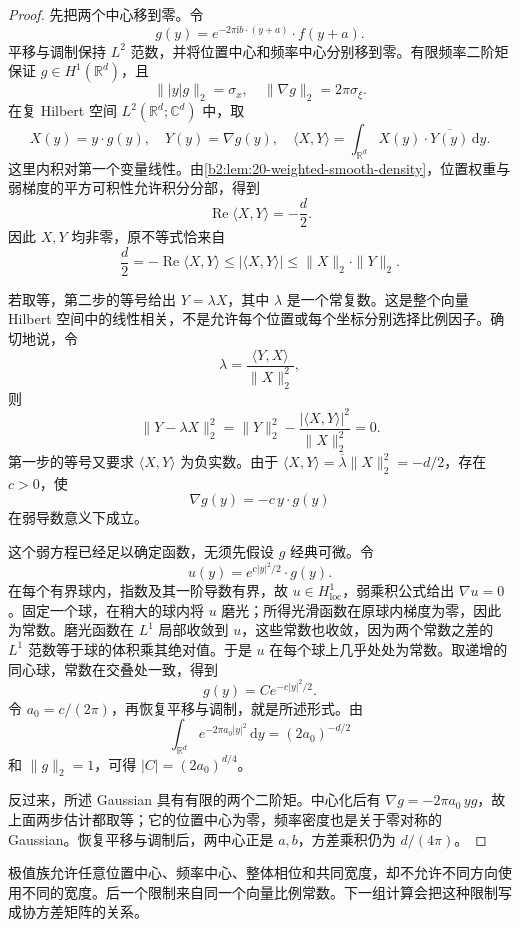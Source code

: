 \begin{proof}
先把两个中心移到零。令
\[
 g(y)=e^{-2\pi\mathrm i b\cdot(y+a)}\cdot f(y+a).
\]
平移与调制保持 \(L^2\) 范数，并将位置中心和频率中心分别移到零。有限频率二阶矩保证 \(g\in H^1(\mathbb R^d)\)，且
\[
 \||y|g\|_2=\sigma_x,
 \quad
 \|\nabla g\|_2=2\pi\sigma_\xi.
\]
在复 Hilbert 空间 \(L^2(\mathbb R^d;\mathbb C^d)\) 中，取
\[
 X(y)=y\cdot g(y),
 \quad
 Y(y)=\nabla g(y),
 \quad
 \langle X,Y\rangle
 =\int_{\mathbb R^d}X(y)\cdot\overline{Y(y)}\,\mathrm dy.
\]
这里内积对第一个变量线性。由\cref{b2:lem:20-weighted-smooth-density}，位置权重与弱梯度的平方可积性允许积分分部，得到
\[
 \operatorname{Re}\langle X,Y\rangle=-\frac d2.
\]
因此 \(X,Y\) 均非零，原不等式恰来自
\[
 \frac d2
 =-\operatorname{Re}\langle X,Y\rangle
 \leq|\langle X,Y\rangle|
 \leq\|X\|_2\cdot\|Y\|_2.
\]

若取等，第二步的等号给出 \(Y=\lambda X\)，其中 \(\lambda\) 是一个常复数。这是整个向量 Hilbert 空间中的线性相关，不是允许每个位置或每个坐标分别选择比例因子。确切地说，令
\[
 \lambda=\frac{\langle Y,X\rangle}{\|X\|_2^2},
\]
则
\[
 \|Y-\lambda X\|_2^2
 =\|Y\|_2^2-\frac{|\langle X,Y\rangle|^2}{\|X\|_2^2}=0.
\]
第一步的等号又要求 \(\langle X,Y\rangle\) 为负实数。由于
\(\langle X,Y\rangle=\overline\lambda\|X\|_2^2=-d/2\)，存在 \(c>0\)，使
\[
 \nabla g(y)=-c\,y\cdot g(y)
\]
在弱导数意义下成立。

这个弱方程已经足以确定函数，无须先假设 \(g\) 经典可微。令
\[
 u(y)=e^{c|y|^2/2}\cdot g(y).
\]
在每个有界球内，指数及其一阶导数有界，故 \(u\in H^1_{\mathrm{loc}}\)，弱乘积公式给出 \(\nabla u=0\)。固定一个球，在稍大的球内将 \(u\) 磨光；所得光滑函数在原球内梯度为零，因此为常数。磨光函数在 \(L^1\) 局部收敛到 \(u\)，这些常数也收敛，因为两个常数之差的 \(L^1\) 范数等于球的体积乘其绝对值。于是 \(u\) 在每个球上几乎处处为常数。取递增的同心球，常数在交叠处一致，得到
\[
 g(y)=C e^{-c|y|^2/2}.
\]
令 \(a_0=c/(2\pi)\)，再恢复平移与调制，就是所述形式。由
\[
 \int_{\mathbb R^d}e^{-2\pi a_0|y|^2}\,\mathrm dy
 =(2a_0)^{-d/2}
\]
和 \(\|g\|_2=1\)，可得 \(|C|=(2a_0)^{d/4}\)。

反过来，所述 Gaussian 具有有限的两个二阶矩。中心化后有
\(\nabla g=-2\pi a_0\,y g\)，故上面两步估计都取等；它的位置中心为零，频率密度也是关于零对称的 Gaussian。恢复平移与调制后，两中心正是 \(a,b\)，方差乘积仍为 \(d/(4\pi)\)。
\end{proof}

极值族允许任意位置中心、频率中心、整体相位和共同宽度，却不允许不同方向使用不同的宽度。后一个限制来自同一个向量比例常数。下一组计算会把这种限制写成协方差矩阵的关系。

